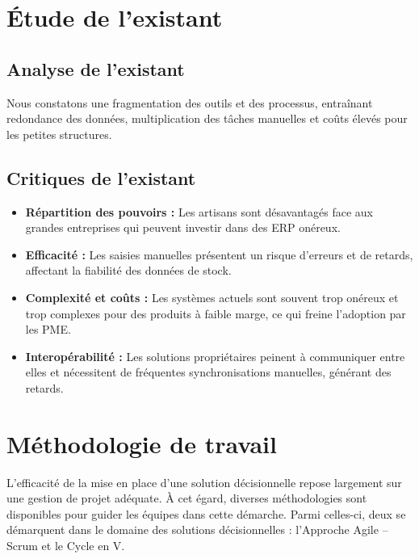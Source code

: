 \documentclass[12pt,a4paper]{report}
\begin{document}
\section{Étude de l’existant}
\subsection{Analyse de l’existant}
Nous constatons une fragmentation des outils et des processus, entraînant redondance des données, multiplication des tâches manuelles et coûts élevés pour les petites structures.

\subsection{Critiques de l’existant}
\begin{itemize}
  \item \textbf{Répartition des pouvoirs :} Les artisans sont désavantagés face aux grandes entreprises qui peuvent investir dans des ERP onéreux.
  \item \textbf{Efficacité :} Les saisies manuelles présentent un risque d’erreurs et de retards, affectant la fiabilité des données de stock.
  \item \textbf{Complexité et coûts :} Les systèmes actuels sont souvent trop onéreux et trop complexes pour des produits à faible marge, ce qui freine l’adoption par les PME.
  \item \textbf{Interopérabilité :} Les solutions propriétaires peinent à communiquer entre elles et nécessitent de fréquentes synchronisations manuelles, générant des retards.
\end{itemize}

\section{Méthodologie de travail}
L’efficacité de la mise en place d’une solution décisionnelle repose largement sur une gestion de projet adéquate. À cet égard, diverses méthodologies sont disponibles pour guider les équipes dans cette démarche. Parmi celles-ci, deux se démarquent dans le domaine des solutions décisionnelles : l’Approche Agile – Scrum et le Cycle en V.
\end{document}
